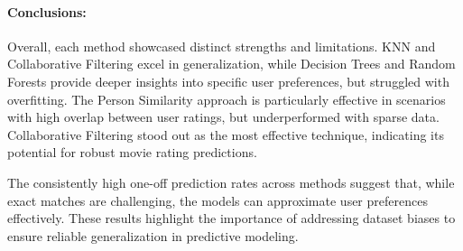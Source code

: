 \documentclass[a4paper,9pt]{article}
\begin{document}
\paragraph{Conclusions:}
Overall, each method showcased distinct strengths and limitations.
KNN and Collaborative Filtering excel in generalization, while Decision Trees and Random Forests provide deeper insights into specific user preferences, but struggled with overfitting.
The Person Similarity approach is particularly effective in scenarios with high overlap between user ratings, but underperformed with sparse data.
Collaborative Filtering stood out as the most effective technique, indicating its potential for robust movie rating predictions.

The consistently high one-off prediction rates across methods suggest that, while exact matches are challenging, the models can approximate user preferences effectively.
These results highlight the importance of addressing dataset biases to ensure reliable generalization in predictive modeling.
\end{document}
